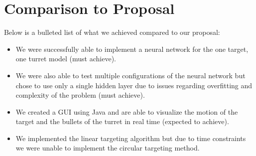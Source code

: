 \documentclass[11pt,letterpaper]{article}
\begin{document}
\section{Comparison to Proposal}
Below is a bulleted list of what we achieved compared to our proposal:

\begin{itemize}
\item
We were successfully able to implement a neural network for the one target, one turret model (must achieve).
\item 
We were also able to test multiple configurations of the neural network but chose to use only a single hidden layer due to issues regarding overfitting and complexity of the problem (must achieve).
\item 
We created a GUI using Java and are able to visualize the motion of the target and the bullets of the turret in real time (expected to achieve).
\item 
We implemented the linear targeting algorithm but due to time constraints we were unable to implement the circular targeting method.
\end{itemize}




\end{document}
